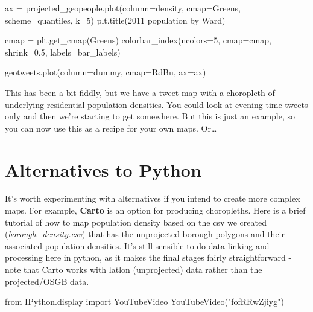 \documentclass[
  letterpaper,
  DIV=11,
  numbers=noendperiod]{scrreprt}
\newenvironment{Shaded}{\begin{snugshade}}{\end{snugshade}}
\newcommand{\DecValTok}[1]{\textcolor[rgb]{0.68,0.00,0.00}{#1}}
\newcommand{\FloatTok}[1]{\textcolor[rgb]{0.68,0.00,0.00}{#1}}
\newcommand{\ImportTok}[1]{\textcolor[rgb]{0.00,0.46,0.62}{#1}}
\newcommand{\NormalTok}[1]{\textcolor[rgb]{0.00,0.23,0.31}{#1}}
\newcommand{\OperatorTok}[1]{\textcolor[rgb]{0.37,0.37,0.37}{#1}}
\newcommand{\StringTok}[1]{\textcolor[rgb]{0.13,0.47,0.30}{#1}}
\begin{document}
\begin{Shaded}
\begin{Highlighting}[]
\NormalTok{ax }\OperatorTok{=}\NormalTok{ projected\_geopeople.plot(column}\OperatorTok{=}\StringTok{\textquotesingle{}density\textquotesingle{}}\NormalTok{, cmap}\OperatorTok{=}\StringTok{\textquotesingle{}Greens\textquotesingle{}}\NormalTok{, scheme}\OperatorTok{=}\StringTok{\textquotesingle{}quantiles\textquotesingle{}}\NormalTok{, k}\OperatorTok{=}\DecValTok{5}\NormalTok{)}
\NormalTok{plt.title(}\StringTok{\textquotesingle{}2011 population by Ward\textquotesingle{}}\NormalTok{)}

\NormalTok{cmap }\OperatorTok{=}\NormalTok{ plt.get\_cmap(}\StringTok{\textquotesingle{}Greens\textquotesingle{}}\NormalTok{)}
\NormalTok{colorbar\_index(ncolors}\OperatorTok{=}\DecValTok{5}\NormalTok{, cmap}\OperatorTok{=}\NormalTok{cmap, shrink}\OperatorTok{=}\FloatTok{0.5}\NormalTok{, labels}\OperatorTok{=}\NormalTok{bar\_labels)}

\NormalTok{geotweets.plot(column}\OperatorTok{=}\StringTok{\textquotesingle{}dummy\textquotesingle{}}\NormalTok{, cmap}\OperatorTok{=}\StringTok{\textquotesingle{}RdBu\textquotesingle{}}\NormalTok{, ax}\OperatorTok{=}\NormalTok{ax)}
\end{Highlighting}
\end{Shaded}

This has been a bit fiddly, but we have a tweet map with a choropleth of
underlying residential population densities. You could look at
evening-time tweets only and then we're starting to get somewhere. But
this is just an example, so you can now use this as a recipe for your
own maps. Or\ldots{}

\hypertarget{alternatives-to-python}{%
\section{Alternatives to Python}\label{alternatives-to-python}}

It's worth experimenting with alternatives if you intend to create more
complex maps. For example, \textbf{Carto} is an option for producing
choropleths. Here is a brief tutorial of how to map population density
based on the csv we created (\emph{borough\_density.csv}) that has the
unprojected borough polygons and their associated population densities.
It's still sensible to do data linking and processing here in python, as
it makes the final stages fairly straightforward - note that Carto works
with latlon (unprojected) data rather than the projected/OSGB data.

\begin{Shaded}
\begin{Highlighting}[]
\ImportTok{from}\NormalTok{ IPython.display }\ImportTok{import}\NormalTok{ YouTubeVideo}
\NormalTok{YouTubeVideo(}\StringTok{"fofRRwZjiyg"}\NormalTok{)}
\end{Highlighting}
\end{Shaded}
\end{document}
